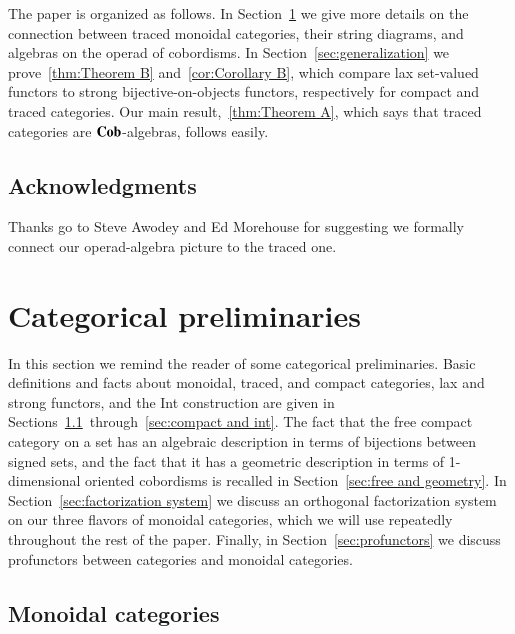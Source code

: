 \documentclass[12pt,oneside,article,draft]{memoir}
\begin{document}
The paper is organized as follows. In Section~\ref{sec:traced categories} we give more details on the connection between traced monoidal categories, their string diagrams, and algebras on the operad of cobordisms. In Section~\ref{sec:generalization} we prove~\ref{thm:Theorem B} and~\ref{cor:Corollary B}, which compare lax set-valued functors to strong bijective-on-objects functors, respectively for compact and traced categories. Our main result,~\ref{thm:Theorem A}, which says that traced categories are $\mathbf{Cob}$-algebras, follows easily.

\section*{Acknowledgments}

Thanks go to Steve Awodey and Ed Morehouse for suggesting we formally connect our operad-algebra picture to the traced one. 

\chapter{Categorical preliminaries}\label{sec:traced categories}

In this section we remind the reader of some categorical preliminaries. Basic definitions and facts about monoidal, traced, and compact categories, lax and strong functors, and the Int construction are given in Sections~\ref{sec:prelim monoidal}~through~\ref{sec:compact and int}. The fact that the free compact category on a set has an algebraic description in terms of bijections between signed sets, and the fact that it has a geometric description in terms of 1-dimensional oriented cobordisms is recalled in Section~\ref{sec:free and geometry}. In Section~\ref{sec:factorization system} we discuss an orthogonal factorization system on our three flavors of monoidal categories, which we will use repeatedly throughout the rest of the paper. Finally, in Section~\ref{sec:profunctors} we discuss profunctors between categories and monoidal categories.

\section{Monoidal categories}\label{sec:prelim monoidal}
\end{document}
